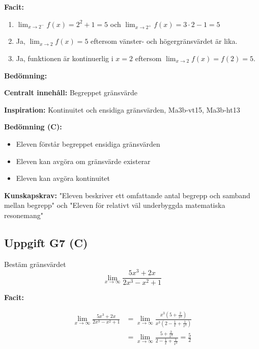 \documentclass[12pt]{article}
\begin{document}
\begin{facitbox}
\textbf{Facit:}

\begin{enumerate}[label=\alph*)]
    \item $\lim_{x \to 2^-} f(x) = 2^2 + 1 = 5$ och $\lim_{x \to 2^+} f(x) = 3 \cdot 2 - 1 = 5$
    \item Ja, $\lim_{x \to 2} f(x) = 5$ eftersom vänster- och högergränsvärdet är lika.
    \item Ja, funktionen är kontinuerlig i $x = 2$ eftersom $\lim_{x \to 2} f(x) = f(2) = 5$.
\end{enumerate}
\end{facitbox}

\begin{refbox}
\textbf{Bedömning:}

\textbf{Centralt innehåll:} Begreppet gränsvärde

\textbf{Inspiration:} Kontinuitet och ensidiga gränsvärden, Ma3b-vt15, Ma3b-ht13

\textbf{Bedömning (C):}
\begin{itemize}
    \item Eleven förstår begreppet ensidiga gränsvärden
    \item Eleven kan avgöra om gränsvärde existerar
    \item Eleven kan avgöra kontinuitet
\end{itemize}

\textbf{Kunskapskrav:} "Eleven beskriver ett omfattande antal begrepp och samband mellan begrepp" och "Eleven för relativt väl underbyggda matematiska resonemang"
\end{refbox}

\subsection*{Uppgift G7 (C)}
Bestäm gränsvärdet
\[
\lim_{x \to \infty} \frac{5x^3 + 2x}{2x^3 - x^2 + 1}
\]

\begin{facitbox}
\textbf{Facit:}

\begin{align*}
\lim_{x \to \infty} \frac{5x^3 + 2x}{2x^3 - x^2 + 1} &= \lim_{x \to \infty} \frac{x^3(5 + \frac{2}{x^2})}{x^3(2 - \frac{1}{x} + \frac{1}{x^3})} \\
&= \lim_{x \to \infty} \frac{5 + \frac{2}{x^2}}{2 - \frac{1}{x} + \frac{1}{x^3}} = \frac{5}{2}
\end{align*}
\end{facitbox}
\end{document}
